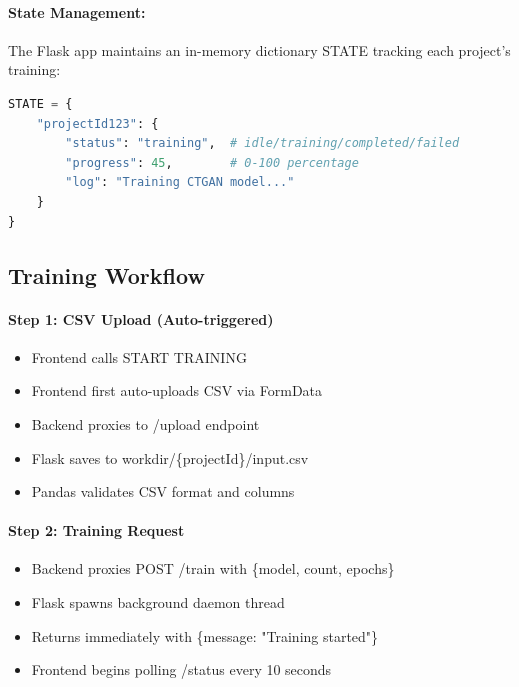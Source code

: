 \documentclass[11pt,a4paper]{article}
\begin{document}
\paragraph{State Management:}
The Flask app maintains an in-memory dictionary STATE tracking each project's training:
\begin{lstlisting}[language=Python]
STATE = {
    "projectId123": {
        "status": "training",  # idle/training/completed/failed
        "progress": 45,        # 0-100 percentage
        "log": "Training CTGAN model..."
    }
}
\end{lstlisting}

\subsection{Training Workflow}

\paragraph{Step 1: CSV Upload (Auto-triggered)}
\begin{itemize}[noitemsep]
    \item Frontend calls START TRAINING
    \item Frontend first auto-uploads CSV via FormData
    \item Backend proxies to /upload endpoint
    \item Flask saves to workdir/\{projectId\}/input.csv
    \item Pandas validates CSV format and columns
\end{itemize}

\paragraph{Step 2: Training Request}
\begin{itemize}[noitemsep]
    \item Backend proxies POST /train with \{model, count, epochs\}
    \item Flask spawns background daemon thread
    \item Returns immediately with \{message: "Training started"\}
    \item Frontend begins polling /status every 10 seconds
\end{itemize}
\end{document}
